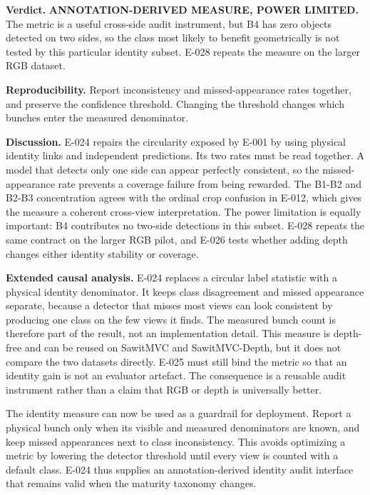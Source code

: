 \documentclass[preprint,12pt]{elsarticle}
\begin{document}
\textbf{Verdict.} \textbf{ANNOTATION-DERIVED MEASURE, POWER LIMITED.} The
metric is a useful cross-side audit instrument, but B4 has zero objects
detected on two sides,
so the class most likely to benefit geometrically is not tested by this
particular identity subset. E-028 repeats the measure on the larger RGB
dataset.

\textbf{Reproducibility.} Report inconsistency and missed-appearance rates
together, and preserve the confidence threshold. Changing the threshold
changes which bunches enter the measured denominator.

\textbf{Discussion.} E-024 repairs the circularity exposed by E-001 by using
physical identity links and independent predictions. Its two rates must be
read together. A model that detects only one side can appear perfectly
consistent, so the missed-appearance rate prevents a coverage failure from
being rewarded. The B1-B2 and B2-B3 concentration agrees with the ordinal
crop confusion in E-012, which gives the measure a coherent cross-view
interpretation. The power limitation is equally important: B4 contributes no
two-side detections in this subset. E-028 repeats the same contract on the
larger RGB pilot, and E-026 tests whether adding depth changes either identity
stability or coverage.

\textbf{Extended causal analysis.} E-024 replaces a circular label statistic
with a physical identity denominator. It keeps class disagreement and missed
appearance separate, because a detector that misses most views can look
consistent by producing one class on the few views it finds. The measured
bunch count is therefore part of the result, not an implementation detail.
This measure is depth-free and can be reused on SawitMVC and SawitMVC-Depth,
but it does not compare the two datasets directly. E-025 must still bind the
metric so that an identity gain is not an evaluator artefact. The consequence
is a reusable audit instrument rather than a claim that RGB or depth is
universally better.

The identity measure can now be used as a guardrail for deployment. Report a
physical bunch only when its visible and measured denominators are known, and
keep missed appearances next to class inconsistency. This avoids optimizing a
metric by lowering the detector threshold until every view is counted with a
default class. E-024 thus supplies an annotation-derived identity audit interface
that remains valid when the maturity taxonomy changes.
\end{document}
